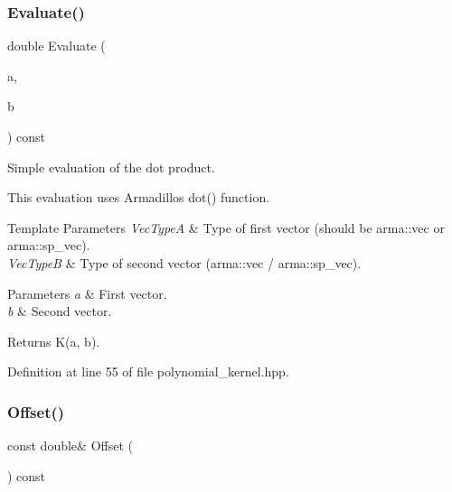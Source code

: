 \subsubsection{Evaluate()}
{\footnotesize\ttfamily double Evaluate (\begin{DoxyParamCaption}\item[{const Vec\+TypeA \&}]{a,  }\item[{const Vec\+TypeB \&}]{b }\end{DoxyParamCaption}) const\hspace{0.3cm}{\ttfamily [inline]}}



Simple evaluation of the dot product. 

This evaluation uses Armadillo\textquotesingle{}s dot() function.


\begin{DoxyTemplParams}{Template Parameters}
{\em Vec\+TypeA} & Type of first vector (should be arma\+::vec or arma\+::sp\+\_\+vec). \\
\hline
{\em Vec\+TypeB} & Type of second vector (arma\+::vec / arma\+::sp\+\_\+vec). \\
\hline
\end{DoxyTemplParams}

\begin{DoxyParams}{Parameters}
{\em a} & First vector. \\
\hline
{\em b} & Second vector. \\
\hline
\end{DoxyParams}
\begin{DoxyReturn}{Returns}
K(a, b). 
\end{DoxyReturn}


Definition at line 55 of file polynomial\+\_\+kernel.\+hpp.

\mbox{\label{classmlpack_1_1kernel_1_1PolynomialKernel_a9e3dd48cd75fe62a88d7d5a74a31aef0}} 
\subsubsection{Offset()\hspace{0.1cm}{\footnotesize\ttfamily [1/2]}}
{\footnotesize\ttfamily const double\& Offset (\begin{DoxyParamCaption}{ }\end{DoxyParamCaption}) const\hspace{0.3cm}{\ttfamily [inline]}}



